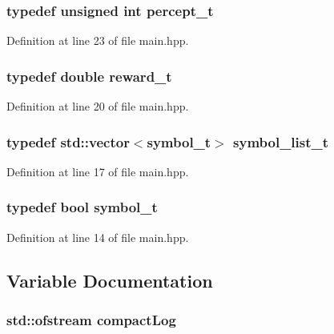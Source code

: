 \subsubsection[{percept\+\_\+t}]{\setlength{\rightskip}{0pt plus 5cm}typedef unsigned int {\bf percept\+\_\+t}}\label{main_8hpp_a6be73834eb109c1d8bb86b99f4dc7e16}


Definition at line 23 of file main.\+hpp.

\subsubsection[{reward\+\_\+t}]{\setlength{\rightskip}{0pt plus 5cm}typedef double {\bf reward\+\_\+t}}\label{main_8hpp_a008010a51f193f33b2e94c75e10d30b2}


Definition at line 20 of file main.\+hpp.

\subsubsection[{symbol\+\_\+list\+\_\+t}]{\setlength{\rightskip}{0pt plus 5cm}typedef std\+::vector$<${\bf symbol\+\_\+t}$>$ {\bf symbol\+\_\+list\+\_\+t}}\label{main_8hpp_a96913eb6aee99146c546467f52cf18dc}


Definition at line 17 of file main.\+hpp.

\subsubsection[{symbol\+\_\+t}]{\setlength{\rightskip}{0pt plus 5cm}typedef bool {\bf symbol\+\_\+t}}\label{main_8hpp_a9b3af827bd2e8ad5d4d0d36c6ef7e897}


Definition at line 14 of file main.\+hpp.



\subsection{Variable Documentation}
\subsubsection[{compact\+Log}]{\setlength{\rightskip}{0pt plus 5cm}std\+::ofstream compact\+Log}\label{main_8hpp_aea45ea491228e65ad5260c65e592e801}


